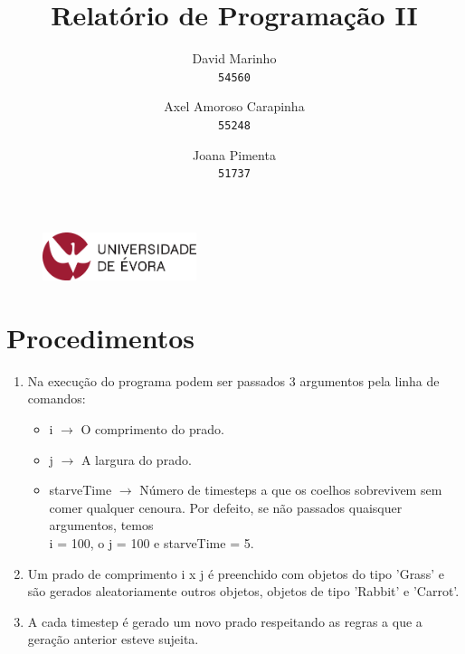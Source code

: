 \documentclass {report}
\title {Relatório de Programação II}
\author{
  David Marinho\\
  \texttt{54560}
  \and
  Axel Amoroso Carapinha\\
  \texttt{55248}
	\and
	Joana Pimenta\\
	\texttt{51737}
}
\begin{document}
\date{}
\begin{figure}[t]
	\vspace {-2cm}
	\centering
	\includegraphics[width=0.4\textwidth]{uni_logo.png}
\end{figure}
\maketitle

\section* {Procedimentos}
\begin{enumerate}
  \item Na execução do programa podem ser passados 3 argumentos pela linha de comandos:
		\begin{itemize}
			\item i \(\rightarrow\) O comprimento do prado.
			\item j \(\rightarrow\) A largura do prado. 
			\item starveTime \(\rightarrow\) Número de timesteps a que os coelhos 
					  sobrevivem sem comer qualquer cenoura. Por defeito, se não passados 
						quaisquer argumentos, temos \\i = 100, o j = 100 e starveTime = 5.
		\end{itemize}
	\item Um prado de comprimento i x j é preenchido com objetos do tipo 'Grass'
				e são gerados aleatoriamente outros objetos, objetos de tipo 'Rabbit' e 
				'Carrot'.
	\item A cada timestep é gerado um novo prado respeitando as regras a que
				a geração anterior esteve sujeita.
\end{enumerate}
\end{document}
